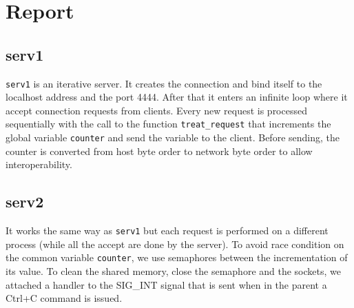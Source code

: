 





\maketitle

%
%
%
%
%


\section{Report}
\subsection{serv1}
\texttt{serv1} is an iterative server. It creates the connection and bind itself to the localhost address and the port 4444. After that it enters an infinite loop where it accept connection requests from clients. Every new request is processed sequentially with the call to the function \texttt{treat\_request} that increments the global variable \texttt{counter} and send the variable to the client. Before sending, the counter is converted from host byte order to network byte order to allow interoperability.

\subsection{serv2}
It works the same way as \texttt{serv1} but each request is performed on a different process (while all the accept are done by the server). To avoid race condition on the common variable \texttt{counter}, we use semaphores between the incrementation of its value. 
To clean the shared memory, close the semaphore and the sockets, we attached a handler to the SIG\_INT signal that is sent when in the parent a Ctrl+C command is issued.

